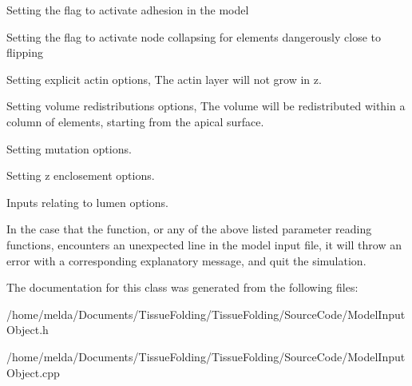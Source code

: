 Setting the flag to activate adhesion in the model

Setting the flag to activate node collapsing for elements dangerously close to flipping

Setting explicit actin options, The actin layer will not grow in z.

Setting volume redistributions options, The volume will be redistributed within a column of elements, starting from the apical surface.

Setting mutation options.

Setting z enclosement options.

Inputs relating to lumen options.

In the case that the function, or any of the above listed parameter reading functions, encounters an unexpected line in the model input file, it will throw an error with a corresponding explanatory message, and quit the simulation.

The documentation for this class was generated from the following files\+:\begin{DoxyCompactItemize}
\item 
/home/melda/\+Documents/\+Tissue\+Folding/\+Tissue\+Folding/\+Source\+Code/Model\+Input\+Object.\+h\item 
/home/melda/\+Documents/\+Tissue\+Folding/\+Tissue\+Folding/\+Source\+Code/Model\+Input\+Object.\+cpp\end{DoxyCompactItemize}
